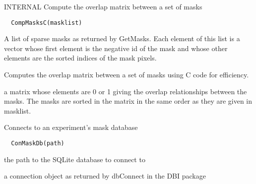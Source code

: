 \documentclass[a4paper]{book}
\begin{document}
%
\begin{Description}\relax
INTERNAL Compute the overlap matrix between a set of
masks
\end{Description}
%
\begin{Usage}
\begin{verbatim}
  CompMasksC(masklist)
\end{verbatim}
\end{Usage}
%
\begin{Arguments}
\begin{ldescription}
\item[\code{masklist}] A list of sparse masks as returned by
GetMasks.  Each element of this list is a vector whose
first element is the negative id of the mask and whose
other elements are the sorted indices of the mask
pixels.
\end{ldescription}
\end{Arguments}
%
\begin{Details}\relax
Computes the overlap matrix between a set of masks using
C code for efficiency.
\end{Details}
%
\begin{Value}
a matrix whose elements are 0 or 1 giving the overlap
relationships between the masks.  The masks are sorted in
the matrix in the same order as they are given in
masklist.
\end{Value}
%
\begin{Description}\relax
Connects to an experiment's mask database
\end{Description}
%
\begin{Usage}
\begin{verbatim}
  ConMaskDb(path)
\end{verbatim}
\end{Usage}
%
\begin{Arguments}
\begin{ldescription}
\item[\code{path}] the path to the SQLite database to connect
to
\end{ldescription}
\end{Arguments}
%
\begin{Value}
a connection object as returned by dbConnect in the DBI
package
\end{Value}
\end{document}
